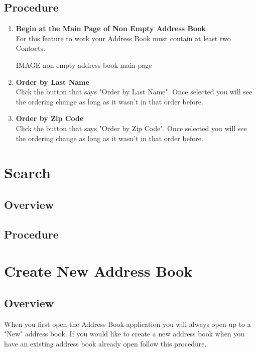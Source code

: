 \documentclass[a4paper, 11pt]{article}
\begin{document}
\subsection{Procedure}
\begin{enumerate}[label=\textbf{\arabic*})]
    \item{\textbf{Begin at the Main Page of Non Empty Address Book}}\\ For this feature to work your Address Book must contain at least two Contacts.
    
    IMAGE non empty address book main page
    
    \item{\textbf{Order by Last Name}}\\ Click the button that says "Order by Last Name". Once selected you will see the ordering change as long as it wasn't in that order before. 
    
    \item{\textbf{Order by Zip Code}}\\ Click the button that says "Order by Zip Code". Once selected you will see the ordering change as long as it wasn't in that order before.
\end{enumerate}


\section{Search}
\subsection{Overview}
\subsection{Procedure}


\section{Create New Address Book}
\subsection{Overview}
When you first open the Address Book application you will always open up to a "New" address book. If you would like to create a new address book when you have an existing address book already open follow this procedure. 
\end{document}
